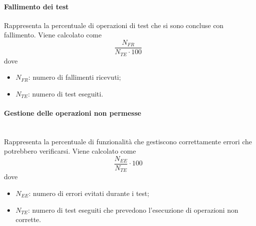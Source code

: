 \paragraph{Fallimento dei test}
Rappresenta la percentuale di operazioni di test che si sono concluse con fallimento. Viene calcolato come
\[\frac{N_{FR}}{N_{TE} \cdot 100}\]
dove
\begin{itemize}
	\item $N_{FR}$: numero di fallimenti ricevuti;
	\item $N_{TE}$: numero di test eseguiti.
\end{itemize}

\paragraph{Gestione delle operazioni non permesse}\mbox{}\\
Rappresenta la percentuale di funzionalità che gestiscono correttamente errori che potrebbero verificarsi. Viene calcolato come
\[ \frac{N_{EE}}{N_{TE}} \cdot 100\]
dove
\begin{itemize}
	\item $N_{EE}$: numero di errori evitati durante i test;
	\item $N_{TE}$: numero di test eseguiti che prevedono l'esecuzione di operazioni non corrette.
\end{itemize} 
